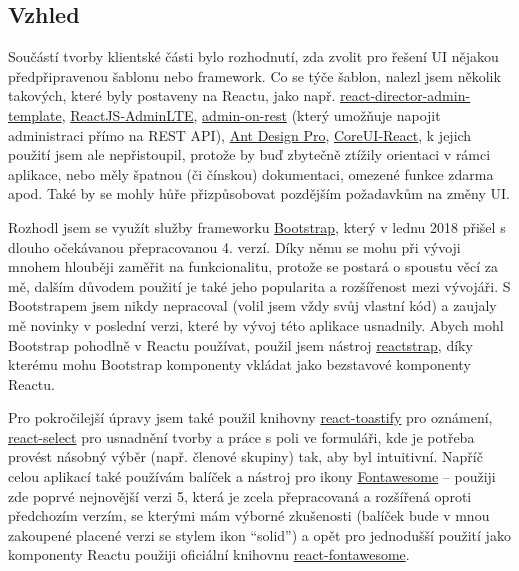     \subsection{Vzhled}
    Součástí tvorby klientské části bylo rozhodnutí, zda zvolit pro řešení UI nějakou předpřipravenou šablonu nebo framework. Co se týče šablon, nalezl jsem několik takových, které byly postaveny na Reactu, jako např. \href{https://github.com/MacKentoch/react-director-admin-template}{react-director-admin-template}, \href{https://github.com/booleanhunter/ReactJS-AdminLTE}{ReactJS-AdminLTE},
    \href{https://github.com/marmelab/admin-on-rest}{admin-on-rest} (který umožňuje napojit administraci přímo na REST API),
    \href{https://github.com/ant-design/ant-design-pro/}{Ant Design Pro},
    \href{https://github.com/mrholek/CoreUI-React}{CoreUI-React}, k jejich použití jsem ale nepřistoupil, protože by buď zbytečně ztížily orientaci v rámci aplikace, nebo měly špatnou (či čínskou) dokumentaci, omezené funkce zdarma apod. Také by se mohly hůře přizpůsobovat pozdějším požadavkům na změny UI.
    
    Rozhodl jsem se využít služby frameworku \href{https://getbootstrap.com}{Bootstrap}, který v lednu 2018 přišel s dlouho očekávanou přepracovanou 4. verzí. Díky němu se mohu při vývoji mnohem hlouběji zaměřit na funkcionalitu, protože se postará o spoustu věcí za mě, dalším důvodem použití je také jeho popularita a rozšířenost \cite{bootstrap} mezi vývojáři. S Bootstrapem jsem nikdy nepracoval (volil jsem vždy svůj vlastní kód) a zaujaly mě novinky v poslední verzi, které by vývoj této aplikace usnadnily. Abych mohl Bootstrap pohodlně v Reactu používat, použil jsem nástroj \href{https://github.com/reactstrap/reactstrap}{reactstrap}, díky kterému mohu Bootstrap komponenty vkládat jako bezstavové komponenty Reactu.
    
    Pro pokročilejší úpravy jsem také použil knihovny \href{https://github.com/fkhadra/react-toastify}{react-toastify} pro oznámení, \href{https://github.com/JedWatson/react-select}{react-select} pro usnadnění tvorby a práce s poli ve formuláři, kde je potřeba provést násobný výběr (např. členové skupiny) tak, aby byl intuitivní. Napříč celou aplikací také používám balíček a nástroj pro ikony \href{https://fontawesome.com/}{Fontawesome} -- použiji zde poprvé nejnovější verzi 5, která je zcela přepracovaná a rozšířená oproti předchozím verzím, se kterými mám výborné zkušenosti (balíček bude v mnou zakoupené placené verzi se stylem ikon \enquote{solid}) a opět pro jednodušší použití jako komponenty Reactu použiji oficiální knihovnu \href{https://github.com/FortAwesome/react-fontawesome}{react-fontawesome}.
    
